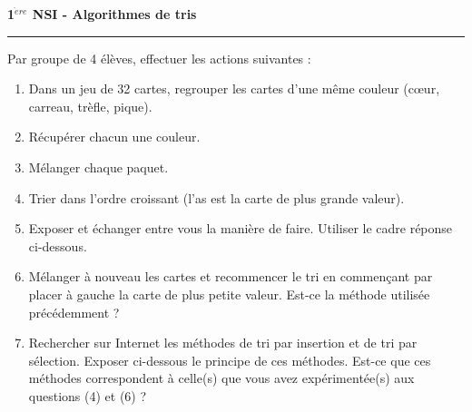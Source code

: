 \documentclass[a4paper,french]{article}
\newcounter{exonum}
\newcommand{\Exo}{\addtocounter{exonum}{1}{{\large \textbf {Exercice \theexonum .}}}}
\newcommand{\Titre}[1]{\textbf{{\large{#1}}}}
\begin{document}
\pagestyle{empty}
\parindent 0mm

\begin{center}
\Titre{1$^{\grave{e}re}$ NSI  -  Algorithmes de tris}
\\[5mm]
\end{center}
\hrule
\vspace*{5mm}

\Exo

Par groupe de 4 élèves, effectuer les actions suivantes :
\begin{enumerate}
\item Dans un jeu de 32 cartes, regrouper les cartes d'une même couleur (cœur, carreau, trèfle, pique).
\item Récupérer chacun une couleur.

\item Mélanger chaque paquet.

\item Trier dans l'ordre croissant (l'as est la carte de plus grande valeur).

\item Exposer et échanger entre vous la manière de faire. Utiliser le cadre réponse ci-dessous.

\noindent{}

\item Mélanger à nouveau les cartes et recommencer le tri en commençant par placer à gauche la carte de plus petite valeur. Est-ce la méthode utilisée précédemment ?

\noindent{}

\item Rechercher sur Internet les méthodes de tri par insertion et de tri par sélection. Exposer ci-dessous le principe de ces méthodes. Est-ce que ces méthodes correspondent à celle(s) que vous avez expérimentée(s) aux questions (4) et (6) ?

\noindent{}
\end{enumerate}
\pagebreak

\Exo
\end{document}
